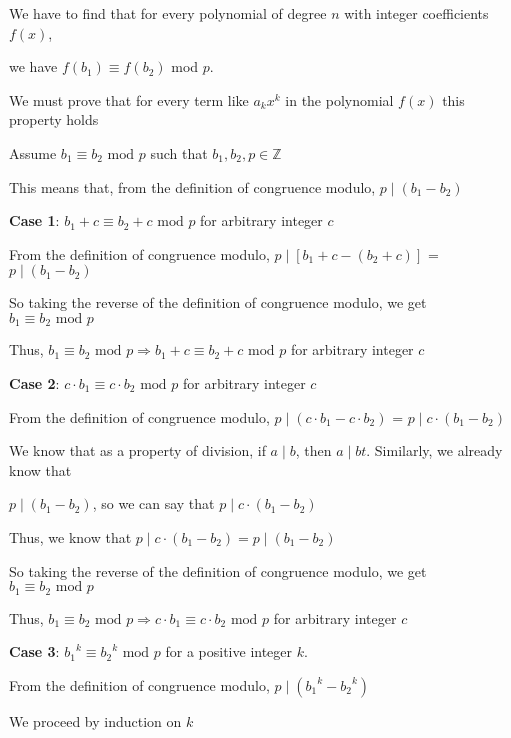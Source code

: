 \documentclass{article} %
\begin{document}
    We have to find that for every polynomial of degree $n$ with integer coefficients $f(x)$, 
    
    we have $f (b_1) \equiv f (b_2)$ mod $p$.
    
    We must prove that for every term like $a_k x^k$ in the polynomial $f (x)$ this property holds
    
    Assume $b_ 1 \equiv b_2 \text{ mod }p$ such that $b_1, b_2, p \in \mathbb{Z}$

    This means that, from the definition of congruence modulo, $p \mid (b_1 - b_2)$

    \textbf{Case 1}: $b_1 + c \equiv b_2 + c \text{ mod } p$ for arbitrary integer $c$

    \tabto{1cm} From the definition of congruence modulo, $p \mid [b_1 + c - (b_2 + c)]$ = $p \mid (b_1 - b_2)$

    \tabto{1cm} So taking the reverse of the definition of congruence modulo, we get $b_1 \equiv b_2 \text{ mod } p$

    \tabto{1cm} Thus, $b_1 \equiv b_2 \text{ mod } p \Rightarrow b_1 + c \equiv b_2 + c \text{ mod } p$ for arbitrary integer $c$

    \textbf{Case 2}: $c \cdot b_1 \equiv c \cdot b_2 \text{ mod } p$ for arbitrary integer $c$

    \tabto{1cm} From the definition of congruence modulo, $p \mid (c \cdot b_1 - c \cdot b_2)$ = $p \mid c \cdot (b_1 - b_2)$

    \tabto{1cm} We know that as a property of division, if $a \mid b$, then $a \mid bt$. Similarly, we already know that 
    
    \tabto{1cm} $p \mid (b_1 - b_2)$, so we can say that $p \mid c \cdot (b_1 - b_2)$

    \tabto{1cm} Thus, we know that $p \mid c \cdot (b_1 - b_2) = p \mid (b_1 - b_2)$
    
    \tabto{1cm} So taking the reverse of the definition of congruence modulo, we get $b_1 \equiv b_2 \text{ mod } p$

    \tabto{1cm} Thus, $b_1 \equiv b_2 \text{ mod } p \Rightarrow c \cdot b_1 \equiv c \cdot b_2 \text{ mod } p$ for arbitrary integer $c$

    \textbf{Case 3}: ${b_1}^k \equiv {b_2}^k \text{ mod } p$ for a positive integer $k$.

    \tabto{1cm} From the definition of congruence modulo, $p \mid ({b_1}^k - {b_2}^k)$

    \tabto{1cm} We proceed by induction on $k$
\end{document}
